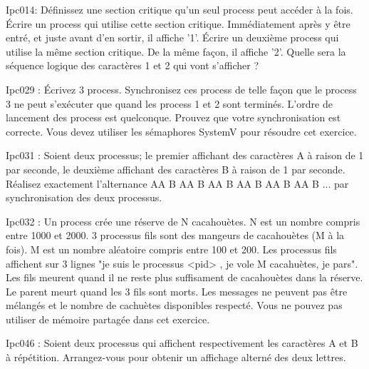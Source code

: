 
\begin{list}{+}{}


\item Ipc014: 
Définissez une section critique qu'un seul process peut accéder à la fois. Écrire un process qui utilise cette section critique. Immédiatement après y être entré, et juste avant d'en sortir, il affiche '1'. Écrire un deuxième process qui utilise la même section critique. De la même façon, il affiche '2'.
Quelle sera la séquence logique des caractères 1 et 2 qui vont s'afficher ?

\item Ipc029 :
Écrivez 3 process. Synchronisez ces process de telle façon que le process 3 ne peut s'exécuter que quand les process 1 et 2 sont terminés. L'ordre de lancement des process est quelconque. Prouvez que votre synchronisation est correcte. Vous devez utiliser les sémaphores SystemV pour résoudre cet exercice.

\item Ipc031 :
Soient deux processus; le premier affichant des caractères A à raison de 1 par seconde, le deuxième affichant des caractères B à raison de 1 par seconde.
Réalisez exactement l'alternance AA B AA B AA B AA B AA B AA B ... par synchronisation des deux processus.

\item Ipc032 :
Un process crée une réserve de N cacahouètes. N est un nombre compris entre 1000 et 2000. 3 processus fils sont des mangeurs de cacahouètes (M à la fois). M est un nombre aléatoire compris entre 100 et 200. Les processus fils affichent sur 3 lignes "je suis le processus <pid> , je vole M cacahuètes, je pars". Les fils meurent quand il ne reste plus suffisament de cacahouètes dans la réserve. Le parent meurt quand les 3 fils sont morts. Les messages ne peuvent pas être mélangés et le nombre de cachuètes disponibles respecté. Vous ne pouvez pas utiliser de mémoire partagée dans cet exercice.

\item Ipc046 :
Soient deux processus qui affichent respectivement les caractères A et B à répétition. Arrangez-vous pour obtenir un affichage alterné des deux lettres.


\end{list}
